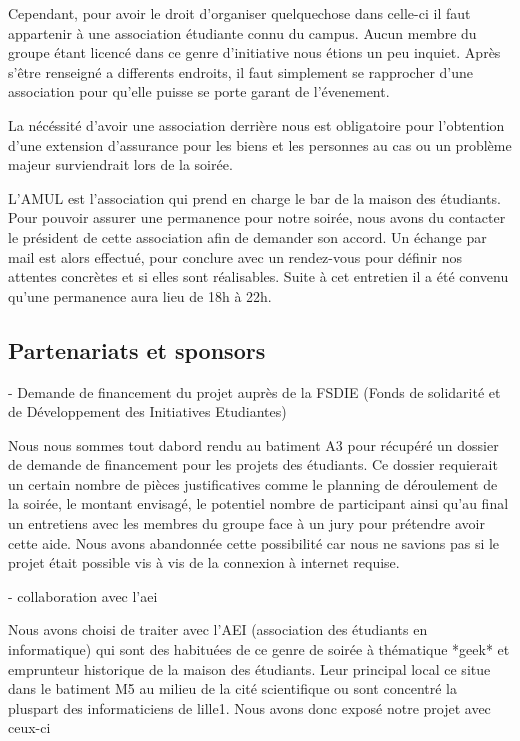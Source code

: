 Cependant, pour avoir le droit d'organiser quelquechose dans celle-ci il
faut appartenir à une association étudiante connu du campus. Aucun
membre du groupe étant licencé dans ce genre d'initiative nous étions un
peu inquiet. Après s'être renseigné a differents endroits, il faut
simplement se rapprocher d'une association pour qu'elle puisse se porte
garant de l'évenement.

La nécéssité d'avoir une association derrière nous est obligatoire pour
l'obtention d'une extension d'assurance pour les biens et les personnes
au cas ou un problème majeur surviendrait lors de la soirée.

L'AMUL est l'association qui prend en charge le bar de la maison des
étudiants.  Pour pouvoir assurer une permanence pour notre soirée, nous
avons du contacter le président de cette association afin de demander
son accord.  Un échange par mail est alors effectué, pour conclure avec
un rendez-vous pour définir nos attentes concrètes et si elles sont
réalisables. Suite à cet entretien il a été convenu qu'une permanence
aura lieu de 18h à 22h.

\subsection{Partenariats et sponsors} %
\label{sub:partenariats_et_sponsors}

- Demande de financement du projet auprès de la FSDIE (Fonds de solidarité
et de Développement des Initiatives Etudiantes)

Nous nous sommes tout dabord rendu au batiment A3 pour récupéré un
dossier de demande de financement pour les projets des étudiants. Ce
dossier requierait un certain nombre de pièces justificatives comme le
planning de déroulement de la soirée, le montant envisagé, le potentiel
nombre de participant ainsi qu'au final un entretiens avec les membres
du groupe face à un jury pour prétendre avoir cette aide. Nous avons
abandonnée cette possibilité car nous ne savions pas si le projet était
possible vis à vis de la connexion à internet requise.

- collaboration avec l'aei

Nous avons choisi de traiter avec l'AEI (association des étudiants
en informatique) qui sont des habituées de ce genre de soirée à
thématique *geek* et emprunteur historique de la maison des étudiants.
Leur principal local ce situe dans le batiment M5 au milieu de la
cité scientifique ou sont concentré la pluspart des informaticiens de
lille1.
Nous avons donc exposé notre projet avec ceux-ci

